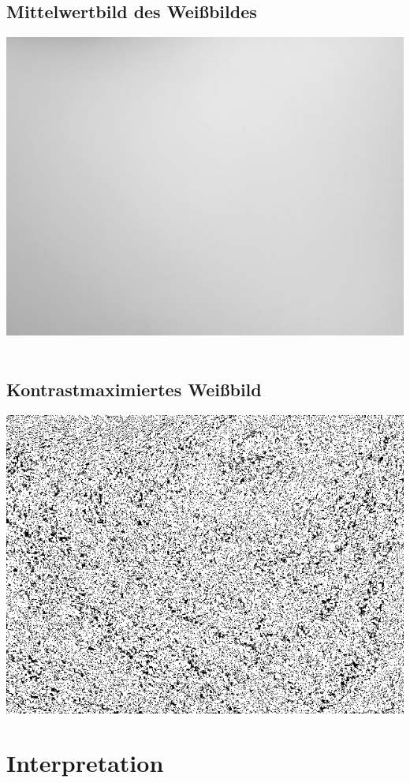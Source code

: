 \subsection*{Mittelwertbild des Weißbildes}
\includegraphics[scale=0.6]{media/weissMean.png}
\

\subsection*{Kontrastmaximiertes Weißbild}
\includegraphics[scale=0.7]{media/weissContrastMax.png}

\section{Interpretation}
\label{chap:VERSUCH_3_INTERPRETATION}

